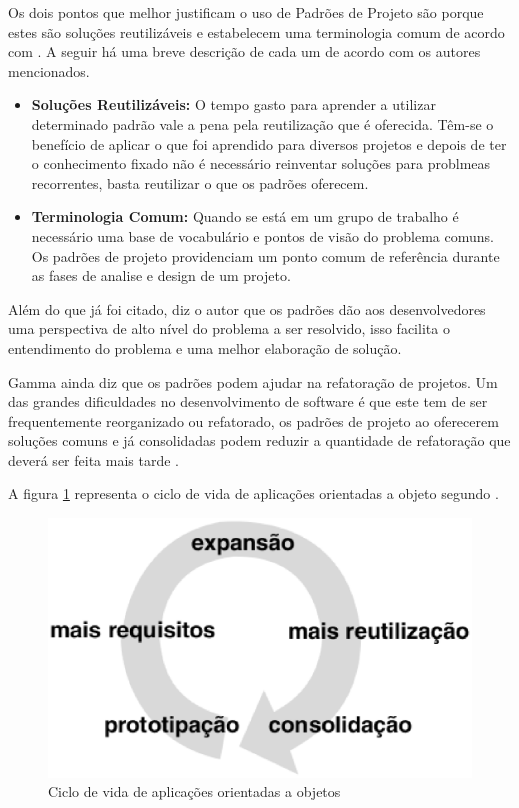 Os dois pontos que melhor justificam o uso de Padrões de Projeto são porque estes são soluções reutilizáveis e estabelecem uma terminologia comum de acordo com \cite{Shalloway:Trott:2004}. A seguir há uma breve descrição de cada um de acordo com os autores mencionados.

\begin{itemize}
	\item \textbf{Soluções Reutilizáveis:} O tempo gasto para aprender a utilizar determinado padrão vale a pena pela reutilização que é oferecida. Têm-se o benefício de aplicar o que foi aprendido para diversos projetos e depois de ter o conhecimento fixado não é necessário reinventar soluções para problmeas recorrentes, basta reutilizar o que os padrões oferecem.
	\item \textbf{Terminologia Comum:} Quando se está em um grupo de trabalho é necessário uma base de vocabulário e pontos de visão do problema comuns. Os padrões de projeto providenciam um ponto comum de referência durante as fases de analise e design de um projeto.
\end{itemize}

Além do que já foi citado, diz o autor que os padrões dão aos desenvolvedores uma perspectiva de alto nível do problema a ser resolvido, isso facilita o entendimento do problema e uma melhor elaboração de solução.

Gamma ainda diz que os padrões podem ajudar na refatoração de projetos. Um das grandes dificuldades no desenvolvimento de software é que este tem de ser frequentemente reorganizado ou refatorado, os padrões de projeto ao oferecerem soluções comuns e já consolidadas podem reduzir a quantidade de refatoração que deverá ser feita mais tarde \cite{Gamma:Helm:Johnson:Vlissides:1995}.

A figura \ref{ciclo de vida oo} representa o ciclo de vida de aplicações orientadas a objeto segundo \cite{Gamma:Helm:Johnson:Vlissides:1995}.

\begin{figure}[!h]
	\centering
	\includegraphics[scale=0.5]{figuras/capitulo2/ciclo_de_vida_oo.eps}
	\caption{Ciclo de vida de aplicações orientadas a objetos}
	\label{ciclo de vida oo}
\end{figure}

